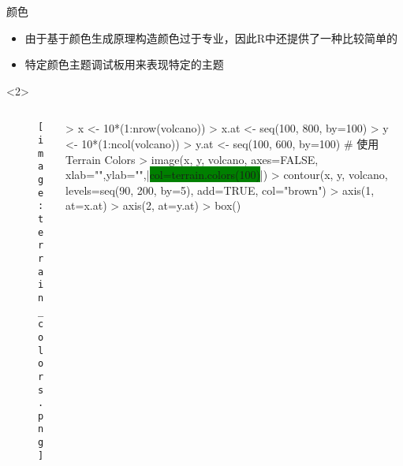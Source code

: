\begin{frame}[t,fragile]{\subsecname}{颜色}
\begin{itemize}
\item 由于基于颜色生成原理构造颜色过于专业，因此R中还提供了一种比较简单的
\item 特定颜色主题调试板用来表现特定的主题
\end{itemize}

\begin{overlayarea}{\textwidth}{\textheight}

\begin{onlyenv}<2>
  \begin{columns}
    \begin{column}{.4\textwidth}
\centering
\begin{figure}
  \texttt{[image: terrain\_colors.png]}
\end{figure}
    \end{column}

    \begin{column}{.6\textwidth}
\centering
\begin{rcode}
> x <- 10*(1:nrow(volcano))
> x.at <- seq(100, 800, by=100)
> y <- 10*(1:ncol(volcano))
> y.at <- seq(100, 600, by=100)
# 使用Terrain Colors 
> image(x, y, volcano, axes=FALSE, xlab="",ylab="",|\colorbox{green}{col=terrain.colors(100)}|)
> contour(x, y, volcano, levels=seq(90, 200, by=5), add=TRUE, col="brown")
> axis(1, at=x.at)
> axis(2, at=y.at)
> box()
\end{rcode}
    \end{column}
  \end{columns}
\end{onlyenv}


\end{overlayarea}
\end{frame}
